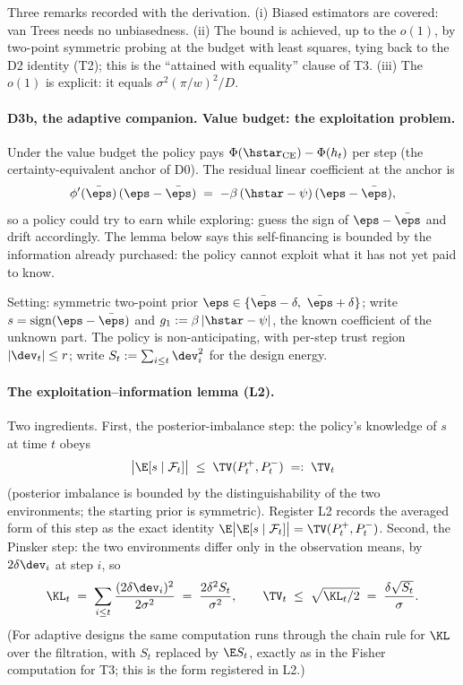 Three remarks recorded with the derivation. (i) Biased estimators are
covered: van Trees needs no unbiasedness. (ii) The bound is achieved, up to
the $o(1)$, by two-point symmetric probing at the budget with least squares,
tying back to the D2 identity (T2); this is the ``attained with equality''
clause of T3. (iii) The $o(1)$ is explicit: it equals
$\sigma^2(\pi/w)^2/D$.

\paragraph{D3b, the adaptive companion. Value budget: the exploitation problem.}
Under the value budget the policy pays
$\Phi(\hstar_{\mathrm{CE}})-\Phi(h_t)$ per step (the certainty-equivalent
anchor of D0). The residual linear coefficient at the anchor is
\begin{equation*}
\phi'(\bar\eps)\,(\eps-\bar\eps)
\;=\; -\beta\,(\hstar-\psi)\,(\eps-\bar\eps),
\end{equation*}
so a policy could try to earn while exploring: guess the sign of
$\eps-\bar\eps$ and drift accordingly. The lemma below says this
self-financing is bounded by the information already purchased: the policy
cannot exploit what it has not yet paid to know.

Setting: symmetric two-point prior
$\eps\in\{\bar\eps-\delta,\ \bar\eps+\delta\}$; write
$s=\operatorname{sign}(\eps-\bar\eps)$ and
$g_1 := \beta\,|\hstar-\psi|$, the known coefficient of the unknown part.
The policy is non-anticipating, with per-step trust region $|\dev_t|\le r$;
write $S_t := \sum_{i\le t}\dev_i^2$ for the design energy.

\paragraph{The exploitation--information lemma (L2).}
Two ingredients. First, the posterior-imbalance step: the policy's knowledge
of $s$ at time $t$ obeys
\begin{equation*}
\big|\E[s\mid\mathcal{F}_t]\big| \;\le\; \TV(P^+_t,P^-_t) \;=:\; \TV_t
\end{equation*}
(posterior imbalance is bounded by the distinguishability of the two
environments; the starting prior is symmetric). Register L2 records the
averaged form of this step as the exact identity
$\E\big|\E[s\mid\mathcal{F}_t]\big| = \TV(P^+_t,P^-_t)$. Second, the
Pinsker step: the two environments differ only in the observation means, by
$2\delta\dev_i$ at step $i$, so
\begin{equation*}
\KL_t \;=\; \sum_{i\le t}\frac{(2\delta\dev_i)^2}{2\sigma^2}
\;=\; \frac{2\delta^2 S_t}{\sigma^2},
\qquad
\TV_t \;\le\; \sqrt{\KL_t/2} \;=\; \frac{\delta\sqrt{S_t}}{\sigma}.
\end{equation*}
(For adaptive designs the same computation runs through the chain rule for
$\KL$ over the filtration, with $S_t$ replaced by $\E S_t$, exactly as in the
Fisher computation for T3; this is the form registered in L2.)

